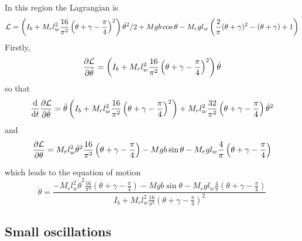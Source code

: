 \documentclass{article}
\begin{document}
\begin{enumerate}
In this region the Lagrangian is
\begin{equation}
{\cal L} = \left(I_b + M_r l_w^2 \frac{16}{\pi^2}\left(\theta+\gamma - \frac{\pi}{4}\right)^2\right) \dot{\theta}^2/2 
+ Mgb \cos \theta - M_r g l_w \left( \frac{2}{\pi}(\theta+\gamma)^2 - (\theta+\gamma) + 1\right)
\end{equation}
Firstly,
\begin{equation}
\frac{\partial \cal L}{\partial \dot{\theta}} = \left(I_b + M_r l_w^2 \frac{16}{\pi^2}\left(\theta+\gamma - \frac{\pi}{4}\right)^2
    \right) \dot\theta
\end{equation}
so that
\begin{equation}
\frac{\mathrm{d} }{\mathrm{d} t} \frac{\partial \cal L}{\partial \dot\theta} = \ddot{\theta} 
	\left(I_b + M_r l_w^2 \frac{16}{\pi^2}\left(\theta+\gamma - \frac{\pi}{4}\right)^2 \right)
+ M_r l_w^2 \frac{32}{\pi^2}\left(\theta+\gamma - \frac{\pi}{4}\right) \dot\theta^2
\end{equation}
and
\begin{equation}
\frac{\partial \cal L}{\partial \theta} = M_r l_w^2 \dot{\theta}^2 \frac{16}{\pi^2}\left(\theta+\gamma - \frac{\pi}{4}\right)
- Mgb \sin \theta
- M_r g l_w \frac{4}{\pi}\left(\theta+\gamma - \frac{\pi}{4}\right)
\end{equation}

which leads to the equation of motion
\begin{equation}
\ddot{\theta} = \frac{
-M_r l_w^2 \dot{\theta}^2 \frac{16}{\pi^2}\left(\theta+\gamma - \frac{\pi}{4}\right)
- Mgb \sin \theta
- M_r g l_w \frac{4}{\pi}\left(\theta+\gamma - \frac{\pi}{4}\right) }
{I_b + M_r l_w^2 \frac{16}{\pi^2}\left(\theta+\gamma - \frac{\pi}{4}\right)^2}
\end{equation}

\end{enumerate}

\subsection{Small oscillations}
\end{document}
